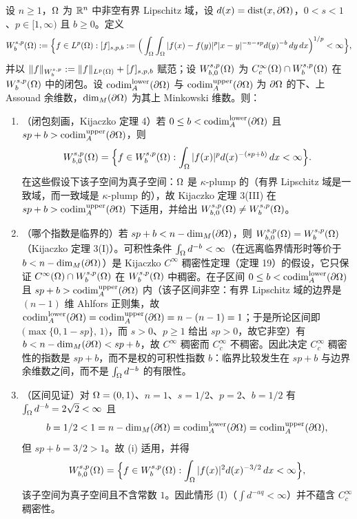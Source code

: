 \begin{theorem}
设 $n\ge1$，$\Omega$ 为 $\mathbb{R}^n$ 中非空有界 Lipschitz 域，设 $d(x)=\operatorname{dist}(x,\partial\Omega)$，$0<s<1$、$p\in[1,\infty)$ 且 $b\ge0$。定义
\[
  W_b^{s,p}(\Omega):=\Big\{f\in L^p(\Omega):
  [f]_{s,p,b}:=\Big(\int_\Omega\int_\Omega|f(x)-f(y)|^p|x-y|^{-n-sp}d(y)^{-b}\,dy\,dx\Big)^{1/p}<\infty\Big\},
\]
并以 $\|f\|_{W_b^{s,p}}:=\|f\|_{L^p(\Omega)}+[f]_{s,p,b}$ 赋范；设 $W_{b,0}^{s,p}(\Omega)$ 为 $C_c^\infty(\Omega)\cap W_b^{s,p}(\Omega)$ 在 $W_b^{s,p}(\Omega)$ 中的闭包。设 $\operatorname{codim}_{A}^{\mathrm{lower}}(\partial\Omega)$ 与 $\operatorname{codim}_{A}^{\mathrm{upper}}(\partial\Omega)$ 为 $\partial\Omega$ 的下、上 Assouad 余维数，$\dim_{M}(\partial\Omega)$ 为其上 Minkowski 维数。则：
\begin{enumerate}[label=(\roman*)]
  \item （闭包刻画，Kijaczko 定理 4）若 $0\le b<\operatorname{codim}_{A}^{\mathrm{lower}}(\partial\Omega)$ 且 $sp+b>\operatorname{codim}_{A}^{\mathrm{upper}}(\partial\Omega)$，则
  \[
    W_{b,0}^{s,p}(\Omega)=\Big\{f\in W_b^{s,p}(\Omega):\int_\Omega|f(x)|^p d(x)^{-(sp+b)}\,dx<\infty\Big\}.
  \]
  在这些假设下该子空间为真子空间：$\Omega$ 是 $\kappa$-plump 的（有界 Lipschitz 域是一致域，而一致域是 $\kappa$-plump 的），故 Kijaczko 定理 3(III) 在 $sp+b>\operatorname{codim}_{A}^{\mathrm{upper}}(\partial\Omega)$ 下适用，并给出 $W_{b,0}^{s,p}(\Omega)\neq W_b^{s,p}(\Omega)$。
  \item （哪个指数是临界的）若 $sp+b<n-\dim_{M}(\partial\Omega)$，则 $W_{b,0}^{s,p}(\Omega)=W_b^{s,p}(\Omega)$（Kijaczko 定理 3(I)）。可积性条件 $\int_\Omega d^{-b}<\infty$（在远离临界情形时等价于 $b<n-\dim_{M}(\partial\Omega)$）是 Kijaczko $C^\infty$ 稠密性定理（定理 19）的假设，它只保证 $C^\infty(\Omega)\cap W_b^{s,p}(\Omega)$ 在 $W_b^{s,p}(\Omega)$ 中稠密。在子区间 $0\le b<\operatorname{codim}_{A}^{\mathrm{lower}}(\partial\Omega)$ 且 $sp+b>\operatorname{codim}_{A}^{\mathrm{upper}}(\partial\Omega)$ 内（该子区间非空：有界 Lipschitz 域的边界是 $(n-1)$ 维 Ahlfors 正则集，故
$\operatorname{codim}_{A}^{\mathrm{lower}}(\partial\Omega)=\operatorname{codim}_{A}^{\mathrm{upper}}(\partial\Omega)=n-(n-1)=1$；于是所论区间即 $\big(\max\{0,1-sp\},\,1\big)$，而 $s>0$、$p\ge1$ 给出 $sp>0$，故它非空）有 $b<n-\dim_{M}(\partial\Omega)<sp+b$，故 $C^\infty$ 稠密而 $C_c^\infty$ 不稠密。因此决定 $C_c^\infty$ 稠密性的指数是 $sp+b$，而不是权的可积性指数 $b$：临界比较发生在 $sp+b$ 与边界余维数之间，而不是 $\int_\Omega d^{-b}$ 的有限性。
  \item （区间见证）对 $\Omega=(0,1)$、$n=1$、$s=1/2$、$p=2$、$b=1/2$ 有 $\int_\Omega d^{-b}=2\sqrt2<\infty$ 且
  \[
    b=1/2<1=n-\dim_{M}(\partial\Omega)=\operatorname{codim}_{A}^{\mathrm{lower}}(\partial\Omega)=\operatorname{codim}_{A}^{\mathrm{upper}}(\partial\Omega),
  \]
  但 $sp+b=3/2>1$。故 (i) 适用，并得
  \[
    W_{b,0}^{s,p}(\Omega)=\Big\{f\in W_b^{s,p}(\Omega):\int_\Omega|f(x)|^2d(x)^{-3/2}\,dx<\infty\Big\},
  \]
  该子空间为真子空间且不含常数 $1$。因此情形 (I)（$\int d^{-aq}<\infty$）并不蕴含 $C_c^\infty$ 稠密性。

\end{enumerate}
\end{theorem}

